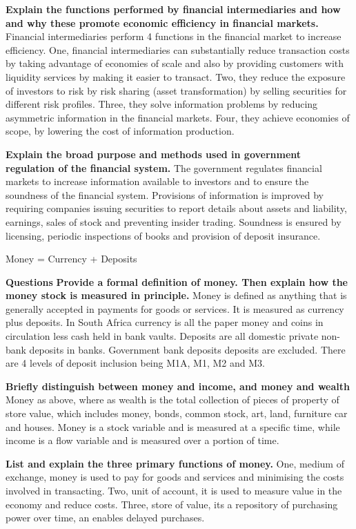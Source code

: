 \documentclass[12pt]{examnotes}
\begin{document}
\textbf{Explain the functions performed by financial intermediaries and how and why these promote economic efficiency in financial markets.}
Financial intermediaries perform 4 functions in the financial market to increase efficiency. One, financial intermediaries can substantially reduce transaction costs by taking advantage of economies of scale and also by providing customers with liquidity services by making it easier to transact. Two, they reduce the exposure of investors to risk by risk sharing (asset transformation) by selling securities for different risk profiles. Three, they solve information problems by reducing asymmetric information in the financial markets. Four, they achieve economies of scope, by lowering the cost of information production.

\textbf{Explain the broad purpose and methods used in government regulation of the financial system.}
The government regulates financial markets to increase information available to investors and to ensure the soundness of the financial system. Provisions of information is improved by requiring companies issuing securities to report details about assets and liability, earnings, sales of stock and preventing insider trading. Soundness is ensured by licensing, periodic inspections of books and provision of deposit insurance.


Money = Currency + Deposits

\textbf{Questions}
\textbf{Provide a formal definition of money. Then explain how the money stock is measured in principle.}
Money is defined as anything that is generally accepted in payments for goods or services. It is measured as currency plus deposits. In South Africa currency is all the paper money and coins in circulation less cash held in bank vaults. Deposits are all domestic private non-bank deposits in banks. Government bank deposits deposits are excluded. There are 4 levels of deposit inclusion being M1A, M1, M2 and M3.

\textbf{Briefly distinguish between money and income, and money and wealth}
Money as above, where as wealth is the total collection of pieces of property of store value, which includes money, bonds, common stock, art, land, furniture car and houses. Money is a stock variable and is measured at a specific time, while income is a flow variable and is measured over a portion of time.

\textbf{List and explain the three primary functions of money.}
One, medium of exchange, money is used to pay for goods and services and minimising the costs involved in transacting. Two, unit of account, it is used to measure value in the economy and reduce costs. Three, store of value, its a repository of purchasing power over time, an enables delayed purchases.
\end{document}
